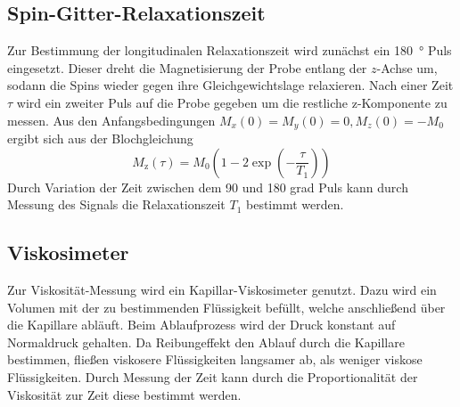\subsection{Spin-Gitter-Relaxationszeit}%
\label{sub:spin_gitter_relaxationszeit}
Zur Bestimmung der longitudinalen Relaxationszeit wird zunächst ein
\SI{180}{\degree}
Puls eingesetzt. 
Dieser dreht die Magnetisierung der Probe entlang der $z$-Achse um, sodann die
Spins wieder gegen ihre Gleichgewichtslage relaxieren.
Nach einer Zeit $\tau$ wird ein zweiter Puls auf die
Probe gegeben um die restliche z-Komponente zu messen. 
Aus den Anfangsbedingungen $M_x(0) = M_y(0) =0, M_z(0)=-M_0$ ergibt sich aus der
Blochgleichung 
\begin{equation}
		\label{eq:magn}
		M_\text{z}(\tau) = M_0 \left(1 - 2 \exp \left(- \frac{\tau}{T_1} \right)
		\right)
\end{equation}
Durch Variation der Zeit zwischen dem 90 und 180 grad Puls kann durch Messung
des Signals die Relaxationszeit $T_1$ bestimmt werden.

\subsection{Viskosimeter}%
\label{sub:viskosimeter}
Zur Viskosität-Messung wird ein Kapillar-Viskosimeter genutzt. 
Dazu wird ein Volumen mit der zu bestimmenden Flüssigkeit befüllt, welche
anschließend über die Kapillare abläuft.
Beim Ablaufprozess wird der Druck konstant auf Normaldruck gehalten. 
Da Reibungeffekt den Ablauf durch die Kapillare bestimmen, fließen viskosere
Flüssigkeiten langsamer ab, als weniger viskose Flüssigkeiten.
Durch Messung der Zeit kann durch die Proportionalität der Viskosität zur Zeit
diese bestimmt werden.
